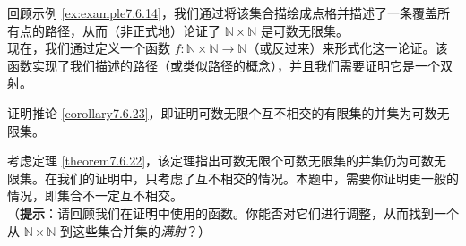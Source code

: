 \begin{exercise}
    回顾示例 \ref{ex:example7.6.14}，我们通过将该集合描绘成点格并描述了一条覆盖所有点的路径，从而（非正式地）论证了 $\mathbb{N} \times \mathbb{N}$ 是可数无限集。\\
    现在，我们通过定义一个函数 $f : \mathbb{N} \times \mathbb{N} \to \mathbb{N}$（或反过来）来形式化这一论证。该函数实现了我们描述的路径（或类似路径的概念），并且我们需要证明它是一个双射。
\end{exercise}

\begin{exercise}
    证明推论 \ref{corollary7.6.23}，即证明可数无限个互不相交的有限集的并集为可数无限集。\label{exc:exercises7.8.36}
\end{exercise}

\begin{exercise}
    考虑定理 \ref{theorem7.6.22}，该定理指出可数无限个可数无限集的并集仍为可数无限集。在我们的证明中，只考虑了互不相交的情况。本题中，需要你证明更一般的情况，即集合不一定互不相交。\\
    （\textbf{提示}：请回顾我们在证明中使用的函数。你能否对它们进行调整，从而找到一个从 $\mathbb{N} \times \mathbb{N}$ 到这些集合并集的\emph{满射}？）\label{exc:exercises7.8.37}
\end{exercise}

